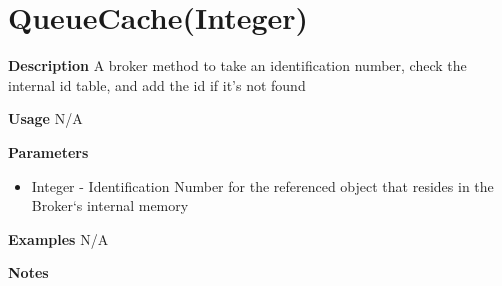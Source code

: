 \documentclass[letterpaper,12pt]{report}
\begin{document}
{
\pagebreak
\section{QueueCache(Integer)}
    \begin{description}
     \item \textbf{Description} 
	\newline \hspace*{1cm} A broker method to take an identification number, check the internal id table, and add the id if it's not found
     \item \textbf{Usage}
	\newline \hspace*{1cm} N/A
     \item \textbf{Parameters}
	\begin{itemize}
	   \item Integer - Identification Number for the referenced object that resides in the Broker`s internal memory
	\end{itemize}
     \item \textbf{Examples}
	\newline \hspace*{1cm} N/A
     \item \textbf{Notes}
	\par \noindent 
    \end{description}

}
\end{document}
